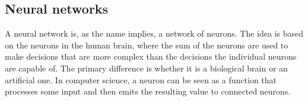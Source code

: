 



\subsection{Neural networks}
A neural network is, as the name implies, a network of neurons.
The idea is based on the neurons in the human brain, where the sum of the neurons are used to make decisions that are more complex than the decisions the individual neurons are capable of.
The primary difference is whether it is a biological brain or an artificial one. 
In computer science, a neuron can be seen as a function that processes some input and then emits the resulting value to connected neurons.

